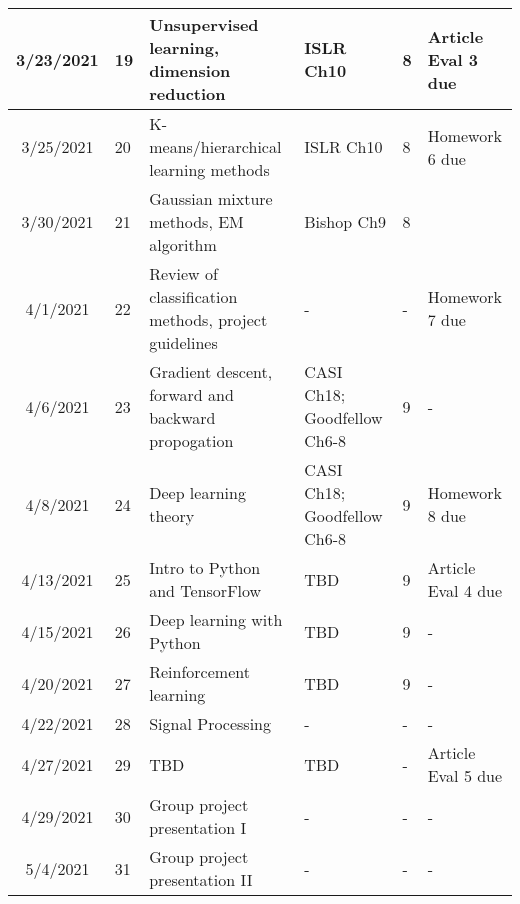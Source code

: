 \documentclass[11pt]{article}
\begin{document}
\begin{center}
\begin{tabular}{c|m{3em}|m{21em}|m{7em}|m{3em}|m{8em}}
3/23/2021 & 19 & Unsupervised learning, dimension reduction & ISLR Ch10 & 8 & Article Eval 3 due \\ \hline
3/25/2021 & 20 & K-means/hierarchical learning methods & ISLR Ch10 &  8 & Homework 6 due \\ \hline
3/30/2021 & 21 & Gaussian mixture methods, EM algorithm & Bishop Ch9 &  8 & \\ \hline
4/1/2021 & 22 & Review of classification methods, project guidelines & - & - & Homework 7 due \\ \hline
4/6/2021 & 23 & Gradient descent, forward and backward propogation & CASI Ch18; Goodfellow Ch6-8 &  9 & - \\ \hline
4/8/2021 & 24 & Deep learning theory & CASI Ch18; Goodfellow Ch6-8 & 9 & Homework 8 due\\ \hline
4/13/2021 & 25 & Intro to Python and TensorFlow & TBD & 9 &  Article Eval 4 due\\ \hline
4/15/2021 & 26 & Deep learning with Python & TBD & 9 & -\\ \hline
4/20/2021 & 27 & Reinforcement learning & TBD & 9 & -\\ \hline
4/22/2021 & 28 & Signal Processing & - & - & -\\ \hline
4/27/2021 & 29 & TBD & TBD & - & Article Eval 5 due\\ \hline
4/29/2021 & 30 & Group project presentation I & - & - & -\\ \hline
5/4/2021 & 31 & Group project presentation II & - & - & - 
\end{tabular}
\end{center}
\end{document}
